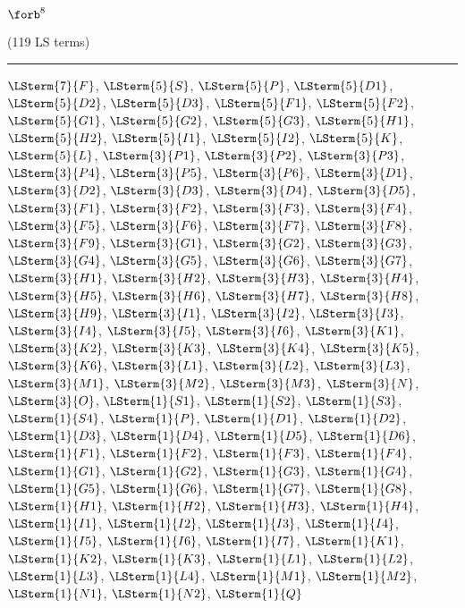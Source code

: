 \begin{mdframed}\begin{center}
$\forb^{8}$

(119 LS terms)
\vspace{0.25cm}\hrule\vspace{0.25cm}

$\LSterm{7}{F}$, $\LSterm{5}{S}$, $\LSterm{5}{P}$, $\LSterm{5}{D1}$, $\LSterm{5}{D2}$, $\LSterm{5}{D3}$, $\LSterm{5}{F1}$, $\LSterm{5}{F2}$, $\LSterm{5}{G1}$, $\LSterm{5}{G2}$, $\LSterm{5}{G3}$, $\LSterm{5}{H1}$, $\LSterm{5}{H2}$, $\LSterm{5}{I1}$, $\LSterm{5}{I2}$, $\LSterm{5}{K}$, $\LSterm{5}{L}$, $\LSterm{3}{P1}$, $\LSterm{3}{P2}$, $\LSterm{3}{P3}$, $\LSterm{3}{P4}$, $\LSterm{3}{P5}$, $\LSterm{3}{P6}$, $\LSterm{3}{D1}$, $\LSterm{3}{D2}$, $\LSterm{3}{D3}$, $\LSterm{3}{D4}$, $\LSterm{3}{D5}$, $\LSterm{3}{F1}$, $\LSterm{3}{F2}$, $\LSterm{3}{F3}$, $\LSterm{3}{F4}$, $\LSterm{3}{F5}$, $\LSterm{3}{F6}$, $\LSterm{3}{F7}$, $\LSterm{3}{F8}$, $\LSterm{3}{F9}$, $\LSterm{3}{G1}$, $\LSterm{3}{G2}$, $\LSterm{3}{G3}$, $\LSterm{3}{G4}$, $\LSterm{3}{G5}$, $\LSterm{3}{G6}$, $\LSterm{3}{G7}$, $\LSterm{3}{H1}$, $\LSterm{3}{H2}$, $\LSterm{3}{H3}$, $\LSterm{3}{H4}$, $\LSterm{3}{H5}$, $\LSterm{3}{H6}$, $\LSterm{3}{H7}$, $\LSterm{3}{H8}$, $\LSterm{3}{H9}$, $\LSterm{3}{I1}$, $\LSterm{3}{I2}$, $\LSterm{3}{I3}$, $\LSterm{3}{I4}$, $\LSterm{3}{I5}$, $\LSterm{3}{I6}$, $\LSterm{3}{K1}$, $\LSterm{3}{K2}$, $\LSterm{3}{K3}$, $\LSterm{3}{K4}$, $\LSterm{3}{K5}$, $\LSterm{3}{K6}$, $\LSterm{3}{L1}$, $\LSterm{3}{L2}$, $\LSterm{3}{L3}$, $\LSterm{3}{M1}$, $\LSterm{3}{M2}$, $\LSterm{3}{M3}$, $\LSterm{3}{N}$, $\LSterm{3}{O}$, $\LSterm{1}{S1}$, $\LSterm{1}{S2}$, $\LSterm{1}{S3}$, $\LSterm{1}{S4}$, $\LSterm{1}{P}$, $\LSterm{1}{D1}$, $\LSterm{1}{D2}$, $\LSterm{1}{D3}$, $\LSterm{1}{D4}$, $\LSterm{1}{D5}$, $\LSterm{1}{D6}$, $\LSterm{1}{F1}$, $\LSterm{1}{F2}$, $\LSterm{1}{F3}$, $\LSterm{1}{F4}$, $\LSterm{1}{G1}$, $\LSterm{1}{G2}$, $\LSterm{1}{G3}$, $\LSterm{1}{G4}$, $\LSterm{1}{G5}$, $\LSterm{1}{G6}$, $\LSterm{1}{G7}$, $\LSterm{1}{G8}$, $\LSterm{1}{H1}$, $\LSterm{1}{H2}$, $\LSterm{1}{H3}$, $\LSterm{1}{H4}$, $\LSterm{1}{I1}$, $\LSterm{1}{I2}$, $\LSterm{1}{I3}$, $\LSterm{1}{I4}$, $\LSterm{1}{I5}$, $\LSterm{1}{I6}$, $\LSterm{1}{I7}$, $\LSterm{1}{K1}$, $\LSterm{1}{K2}$, $\LSterm{1}{K3}$, $\LSterm{1}{L1}$, $\LSterm{1}{L2}$, $\LSterm{1}{L3}$, $\LSterm{1}{L4}$, $\LSterm{1}{M1}$, $\LSterm{1}{M2}$, $\LSterm{1}{N1}$, $\LSterm{1}{N2}$, $\LSterm{1}{Q}$
\end{center}\end{mdframed}

